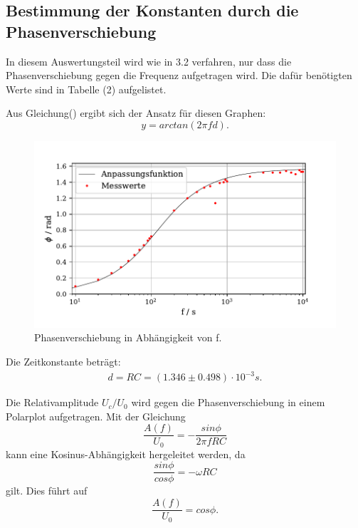 \subsection{Bestimmung der Konstanten durch die Phasenverschiebung}
In diesem Auswertungsteil wird wie in 3.2 verfahren, nur dass die Phasenverschiebung gegen die Frequenz aufgetragen wird.
Die dafür benötigten Werte sind in Tabelle (2) aufgelistet.

\noindent Aus Gleichung() ergibt sich der Ansatz für diesen Graphen:
\begin{equation}
    y = arctan(2 \pi f  d) .
\end{equation}
\begin{figure}[H]
  \centering
  \includegraphics{plot3.pdf}
  \caption{Phasenverschiebung in Abhängigkeit von f.}
  \label{fig:plot}
\end{figure}
Die Zeitkonstante beträgt:
\begin{align*}
   d = RC = (1.346 \pm 0.498) \cdot 10^{-3} s .
\end{align*}



\noindent Die Relativamplitude $U_c/U_0$ wird gegen die Phasenverschiebung in einem Polarplot aufgetragen.
Mit der Gleichung
\begin{equation*}
    \frac{A(f)}{U_0} = -\frac{sin \phi}{2\pi f RC} 
\end{equation*}
kann eine Kosinus-Abhängigkeit hergeleitet werden, da
\begin{equation*}
    \frac{sin\phi}{cos\phi} = -\omega RC 
\end{equation*}
gilt. Dies führt auf
\begin{equation}
    \frac{A(f)}{U_0} = cos\phi .
\end{equation}

